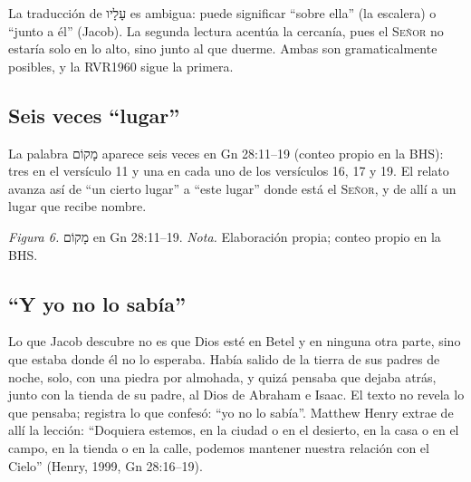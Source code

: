 \documentclass[11pt,letterpaper]{article}
\newcommand{\heb}[1]{\mbox{\foreignlanguage{hebrew}{#1}}}
\newcommand{\SENOR}{\textsc{Señor}}
\begin{document}
\begin{nota}[Precisión]
La traducción de \heb{עָלָיו} es ambigua: puede significar ``sobre ella'' (la escalera) o ``junto a él'' (Jacob). La segunda lectura acentúa la cercanía, pues el \SENOR{} no estaría solo en lo alto, sino junto al que duerme. Ambas son gramaticalmente posibles, y la RVR1960 sigue la primera.
\end{nota}

\subsection{Seis veces ``lugar''}

La palabra \heb{מָקוֹם} aparece seis veces en Gn 28:11--19 (conteo propio en la BHS): tres en el versículo 11 y una en cada uno de los versículos 16, 17 y 19. El relato avanza así de ``un cierto lugar'' a ``este lugar'' donde está el \SENOR{}, y de allí a un lugar que recibe nombre.

\begin{center}
\par
{\footnotesize\color{gris}\textit{Figura 6.} \heb{מָקוֹם} en Gn 28:11--19. \textit{Nota.} Elaboración propia; conteo propio en la BHS.}
\end{center}

\subsection{``Y yo no lo sabía''}

Lo que Jacob descubre no es que Dios esté en Betel y en ninguna otra parte, sino que estaba donde él no lo esperaba. Había salido de la tierra de sus padres de noche, solo, con una piedra por almohada, y quizá pensaba que dejaba atrás, junto con la tienda de su padre, al Dios de Abraham e Isaac. El texto no revela lo que pensaba; registra lo que confesó: ``yo no lo sabía''. Matthew Henry extrae de allí la lección: ``Doquiera estemos, en la ciudad o en el desierto, en la casa o en el campo, en la tienda o en la calle, podemos mantener nuestra relación con el Cielo'' (Henry, 1999, Gn 28:16--19).
\end{document}
